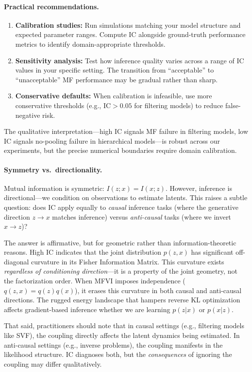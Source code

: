 \documentclass[10pt]{article} %
\theoremstyle{plain}
\theoremstyle{definition}
\newcommand{\IC}{\mathrm{IC}}  %
\begin{document}
\paragraph{Practical recommendations.}
\begin{enumerate}
    \item \textbf{Calibration studies:} Run simulations matching your model structure and expected parameter ranges. Compute IC alongside ground-truth performance metrics to identify domain-appropriate thresholds.
    \item \textbf{Sensitivity analysis:} Test how inference quality varies across a range of IC values in your specific setting. The transition from ``acceptable'' to ``unacceptable'' MF performance may be gradual rather than sharp.
    \item \textbf{Conservative defaults:} When calibration is infeasible, use more conservative thresholds (e.g., $\IC > 0.05$ for filtering models) to reduce false-negative risk.
\end{enumerate}
The qualitative interpretation---high IC signals MF failure in filtering models, low IC signals no-pooling failure in hierarchical models---is robust across our experiments, but the precise numerical boundaries require domain calibration.

\paragraph{Symmetry vs.\ directionality.} Mutual information is symmetric: $I(z;x) = I(x;z)$. However, inference is directional---we condition on observations to estimate latents. This raises a subtle question: does IC apply equally to \emph{causal} inference tasks (where the generative direction $z \to x$ matches inference) versus \emph{anti-causal} tasks (where we invert $x \to z$)?

The answer is affirmative, but for geometric rather than information-theoretic reasons. High IC indicates that the joint distribution $p(z,x)$ has significant off-diagonal curvature in its Fisher Information Matrix. This curvature exists \emph{regardless of conditioning direction}---it is a property of the joint geometry, not the factorization order. When MFVI imposes independence ($q(z,x) = q(z)q(x)$), it erases this curvature in both causal and anti-causal directions. The rugged energy landscape that hampers reverse KL optimization affects gradient-based inference whether we are learning $p(z|x)$ or $p(x|z)$.

That said, practitioners should note that in causal settings (e.g., filtering models like SVF), the coupling directly affects the latent dynamics being estimated. In anti-causal settings (e.g., inverse problems), the coupling manifests in the likelihood structure. IC diagnoses both, but the \emph{consequences} of ignoring the coupling may differ qualitatively.
\end{document}
